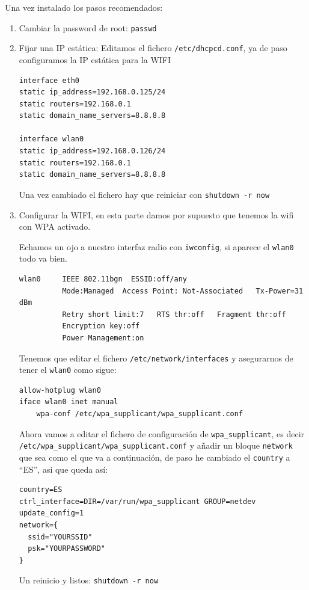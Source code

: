 \documentclass[12pt,spanish,]{article}
\begin{document}
Una vez instalado los pasos recomendados:

\begin{enumerate}
\def\labelenumi{\arabic{enumi}.}
\item
  Cambiar la password de root: \texttt{passwd}
\item
  Fijar una IP estática: Editamos el fichero \texttt{/etc/dhcpcd.conf},
  ya de paso configuramos la IP estática para la WIFI

\begin{verbatim}
interface eth0
static ip_address=192.168.0.125/24
static routers=192.168.0.1
static domain_name_servers=8.8.8.8

interface wlan0
static ip_address=192.168.0.126/24
static routers=192.168.0.1
static domain_name_servers=8.8.8.8
\end{verbatim}

  Una vez cambiado el fichero hay que reiniciar con
  \texttt{shutdown\ -r\ now}
\item
  Configurar la WIFI, en esta parte damos por supuesto que tenemos la
  wifi con WPA activado.

  Echamos un ojo a nuestro interfaz radio con \texttt{iwconfig}, si
  aparece el \texttt{wlan0} todo va bien.

\begin{verbatim}
wlan0     IEEE 802.11bgn  ESSID:off/any
          Mode:Managed  Access Point: Not-Associated   Tx-Power=31 dBm
          Retry short limit:7   RTS thr:off   Fragment thr:off
          Encryption key:off
          Power Management:on
\end{verbatim}

  Tenemos que editar el fichero \texttt{/etc/network/interfaces} y
  asegurarnos de tener el \texttt{wlan0} como sigue:

\begin{verbatim}
allow-hotplug wlan0
iface wlan0 inet manual
    wpa-conf /etc/wpa_supplicant/wpa_supplicant.conf
\end{verbatim}

  Ahora vamos a editar el fichero de configuración de
  \texttt{wpa\_supplicant}, es decir
  \texttt{/etc/wpa\_supplicant/wpa\_supplicant.conf} y añadir un bloque
  \texttt{network} que sea como el que va a continuación, de paso he
  cambiado el \texttt{country} a ``ES'', asi que queda así:

\begin{verbatim}
country=ES
ctrl_interface=DIR=/var/run/wpa_supplicant GROUP=netdev
update_config=1
network={
  ssid="YOURSSID"
  psk="YOURPASSWORD"
}
\end{verbatim}

  Un reinicio y listos: \texttt{shutdown\ -r\ now}
\end{enumerate}
\end{document}
